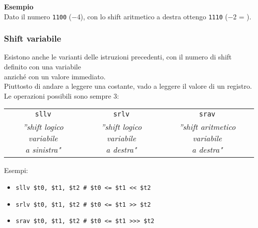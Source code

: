 \documentclass[../main.tex]{subfiles}
\begin{document}
\noindent
\textbf{Esempio} \\
Dato il numero \texttt{1100} ($-$4), con lo shift aritmetico a destra
ottengo \texttt{1110} ($-$2 = ).

\newpage

\subsubsection{Shift variabile}
Esistono anche le varianti delle istruzioni precedenti,
con il numero di shift definito con una variabile \\
anziché con un valore immediato. \\
Piuttosto di andare a leggere una costante, vado a leggere
il valore di un registro. \\
Le operazioni possibili sono sempre 3:
\begin{table}[h!]
    \centering

    \setlength{\tabcolsep}{24pt}
    \begin{tabular}{ c | c | c }
        \texttt{sllv} & \texttt{srlv} & \texttt{srav} \\
        \makecell{\textit{''shift logico variabile} \\ \textit{a sinistra"}} & \makecell{\textit{''shift logico variabile} \\ \textit{a destra"}} & \makecell{\textit{''shift aritmetico variabile} \\ \textit{a destra"}} \\
    \end{tabular}
\end{table}

\noindent
Esempi:
\begin{itemize}
    \item \texttt{sllv \$t0, \$t1, \$t2 \hspace*{0cm} \hspace*{0cm} \# \$t0 <= \$t1 << \$t2}
    \item \texttt{srlv \$t0, \$t1, \$t2 \hspace*{0cm} \hspace*{0cm} \# \$t0 <= \$t1 >> \$t2}
    \item \texttt{srav \$t0, \$t1, \$t2 \hspace*{0cm} \hspace*{0cm} \# \$t0 <= \$t1 >>> \$t2}
\end{itemize}

\vspace*{5mm}
\end{document}
